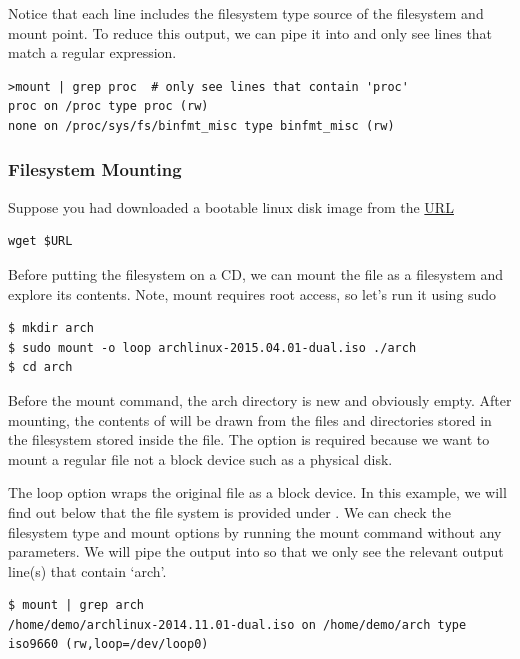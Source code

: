 Notice that each line includes the filesystem type source of the filesystem and mount point.
To reduce this output, we can pipe it into  and only see lines that match a regular expression.

\begin{verbatim}
>mount | grep proc  # only see lines that contain 'proc'
proc on /proc type proc (rw)
none on /proc/sys/fs/binfmt_misc type binfmt_misc (rw)
\end{verbatim}

\subsubsection{Filesystem Mounting}

Suppose you had downloaded a bootable linux disk image from the \href{http://cosmos.cites.illinois.edu/pub/archlinux/iso/2015.04.01/archlinux-2015.04.01-dual.iso}{URL}

\begin{verbatim}
wget $URL
\end{verbatim}

Before putting the filesystem on a CD, we can mount the file as a filesystem and explore its contents.
Note, mount requires root access, so let's run it using sudo

\begin{verbatim}
$ mkdir arch
$ sudo mount -o loop archlinux-2015.04.01-dual.iso ./arch
$ cd arch
\end{verbatim}

Before the mount command, the arch directory is new and obviously empty.
After mounting, the contents of  will be drawn from the files and directories stored in the filesystem stored inside the  file.
The  option is required because we want to mount a regular file not a block device such as a physical disk.

The loop option wraps the original file as a block device.
In this example, we will find out below that the file system is provided under .
We can check the filesystem type and mount options by running the mount command without any parameters.
We will pipe the output into  so that we only see the relevant output line(s) that contain `arch'.

\begin{verbatim}
$ mount | grep arch
/home/demo/archlinux-2014.11.01-dual.iso on /home/demo/arch type iso9660 (rw,loop=/dev/loop0)
\end{verbatim}

